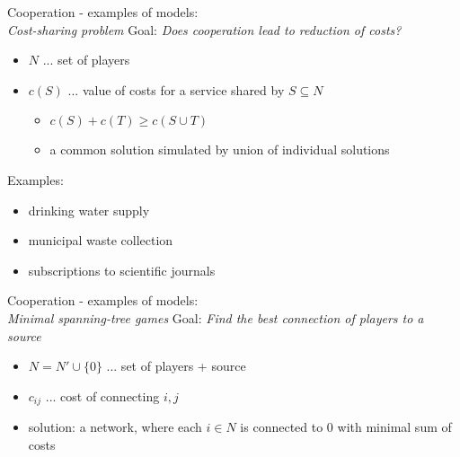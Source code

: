\documentclass{beamer}
\begin{document}
\begin{frame}{Cooperation - examples of models:\\ \textit{Cost-sharing problem}}
    Goal: \textit{Does cooperation lead to reduction of costs?}
    \begin{itemize}
        \item<2-> $N$ ... set of players
        \item<3-> $c(S)$ ... value of costs for a service shared by $S \subseteq N$
        \begin{itemize}
            \item<4-> $c(S) + c(T) \geq c(S \cup T)$
            \item<5-> \small{a common solution simulated by union of individual solutions}
        \end{itemize}
    \end{itemize}
    Examples:
    \begin{itemize}
        \item<6-> drinking water supply
        \item<7-> municipal waste collection
        \item<8-> subscriptions to scientific journals
    \end{itemize}
	
\end{frame}




\begin{frame}{Cooperation - examples of models:\\ \textit{Minimal spanning-tree games}}
	Goal: \textit{Find the best connection of players to a source}
	\begin{itemize}
		\item<2-> $N = N' \cup \{0\}$ ... set of players + source
		\item<3-> $c_{ij}$ ... cost of connecting $i,j$
		\item<4-> solution: a network, where each $i \in N$ is connected to $0$ with minimal sum of costs
	\end{itemize}
	
\end{frame}



\end{document}
